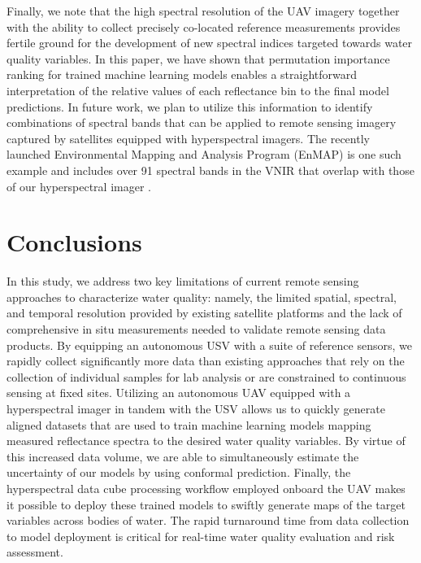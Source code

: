 \documentclass[remotesensing,article,accept,pdftex,moreauthors]{Definitions/mdpi}
\begin{document}
Finally, we note that the high spectral resolution of the UAV imagery together with the ability to collect precisely co-located reference measurements provides fertile ground for the development of new spectral indices targeted towards water quality variables. In this paper, we have shown that permutation importance ranking for trained machine learning models enables a straightforward interpretation of the relative values of each reflectance bin to the final model predictions. In future work, we plan to utilize this information to identify combinations of spectral bands that can be applied to remote sensing imagery captured by satellites equipped with hyperspectral imagers. The recently launched Environmental Mapping and Analysis Program (EnMAP) is one such example and includes over 91 spectral bands in the VNIR that overlap with those of our hyperspectral imager \cite{Storch2023TheEI}. 


\section{Conclusions}

In this study, we address two key limitations of current remote sensing approaches to characterize water quality: namely, the limited spatial, spectral, and temporal resolution provided by existing satellite platforms and the lack of comprehensive in situ measurements needed to validate remote sensing data products. By equipping an autonomous USV with a suite of reference sensors, we rapidly collect significantly more data than existing approaches that rely on the collection of individual samples for lab analysis or are constrained to continuous sensing at fixed sites. Utilizing an autonomous UAV equipped with a hyperspectral imager in tandem with the USV allows us to quickly generate aligned datasets that are used to train machine learning models mapping measured reflectance spectra to the desired water quality variables. By virtue of this increased data volume, we are able to simultaneously estimate the uncertainty of our models by using conformal prediction. Finally, the hyperspectral data cube processing workflow employed onboard the UAV makes it possible to deploy these trained models to swiftly generate maps of the target variables across bodies of water. The rapid turnaround time from data collection to model deployment is critical for real-time water quality evaluation and risk assessment. 
\end{document}
